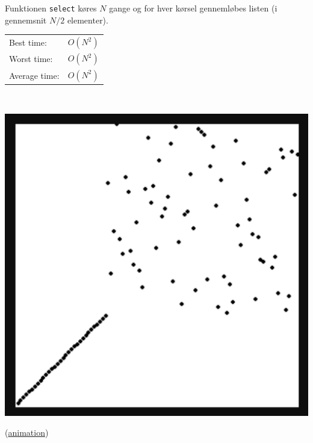 \documentclass[rgb]{beamer}
\begin{document}
\begin{frame}[fragile]
\begin{footnotesize}


\vspace{1ex}

\begin{minipage}[b]{0.55\textwidth}

  Funktionen \lstinline{select} køres $N$ gange og for hver kørsel
  gennemløbes listen (i gennemsnit $N/2$ elementer).

\vspace{1ex}


\vspace{1ex}
  \begin{tabular}{ll}
    Best time: & $O(N^2)$ \\
    Worst time: & $O(N^2)$ \\
    Average time: & $O(N^2)$
  \end{tabular}

  \vfill
\mbox{ }
\end{minipage} \hspace{1cm}
\begin{minipage}[b]{0.3\textwidth}

  \includegraphics[width=\textwidth]{../images/ssort_gif.png}

  (\href{https://upload.wikimedia.org/wikipedia/commons/b/b0/Selection_sort_animation.gif}{animation})
\end{minipage}

\end{footnotesize}
\end{frame}
\end{document}
